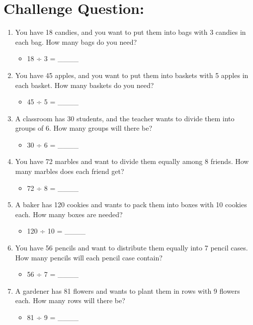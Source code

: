 \section{Challenge Question:}
\begin{enumerate}
    \item You have 18 candies, and you want to put them into bags with 3 candies in each bag. How many bags do you need?
    \begin{itemize}
        \item 18 ÷ 3 = \_\_\_\_
    \end{itemize}
    \item You have 45 apples, and you want to put them into baskets with 5 apples in each basket. How many baskets do you need?
    \begin{itemize}
        \item 45 ÷ 5 = \_\_\_\_
    \end{itemize}
    \item A classroom has 30 students, and the teacher wants to divide them into groups of 6. How many groups will there be?
    \begin{itemize}
        \item 30 ÷ 6 = \_\_\_\_
    \end{itemize}
    \item You have 72 marbles and want to divide them equally among 8 friends. How many marbles does each friend get?
    \begin{itemize}
        \item 72 ÷ 8 = \_\_\_\_
    \end{itemize}
    \item A baker has 120 cookies and wants to pack them into boxes with 10 cookies each. How many boxes are needed?
    \begin{itemize}
        \item 120 ÷ 10 = \_\_\_\_
    \end{itemize}
    \item You have 56 pencils and want to distribute them equally into 7 pencil cases. How many pencils will each pencil case contain?
    \begin{itemize}
        \item 56 ÷ 7 = \_\_\_\_
    \end{itemize}
    \item A gardener has 81 flowers and wants to plant them in rows with 9 flowers each. How many rows will there be?
    \begin{itemize}
        \item 81 ÷ 9 = \_\_\_\_

\end{itemize}
\end{enumerate}
